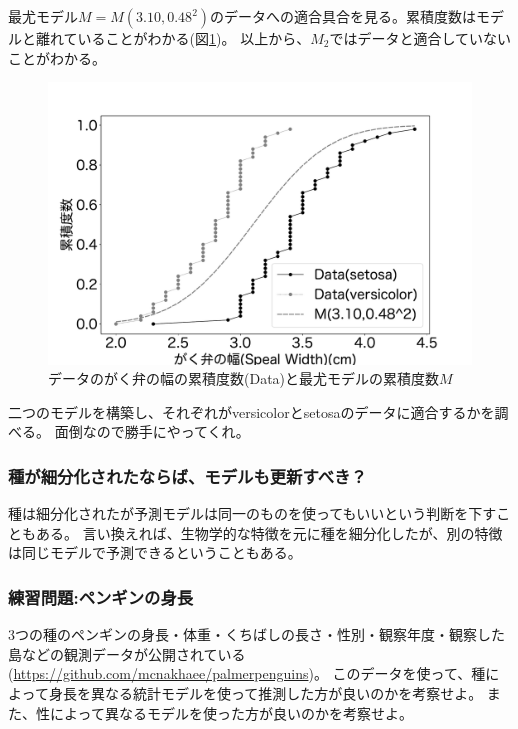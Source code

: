 最尤モデル$M=M(3.10,0.48^2)$のデータへの適合具合を見る。累積度数はモデルと離れていることがわかる(図\ref{fig:speal_width_setosa_versi_model})。
以上から、$M_2$ではデータと適合していないことがわかる。


\begin{figure}
    \begin{center}
        \includegraphics[width=15cm]{./image/15_/speal_width_seto_versi_model.pdf}
        \caption{データのがく弁の幅の累積度数(Data)と最尤モデルの累積度数$M$}
        \label{fig:speal_width_setosa_versi_model}
    \end{center}
\end{figure}


二つのモデルを構築し、それぞれがversicolorとsetosaのデータに適合するかを調べる。
面倒なので勝手にやってくれ。


\subsubsection{種が細分化されたならば、モデルも更新すべき？}
種は細分化されたが予測モデルは同一のものを使ってもいいという判断を下すこともある。
言い換えれば、生物学的な特徴を元に種を細分化したが、別の特徴は同じモデルで予測できるということもある。

\subsubsection{練習問題:ペンギンの身長}
3つの種のペンギンの身長・体重・くちばしの長さ・性別・観察年度・観察した島などの観測データが公開されている(\url{https://github.com/mcnakhaee/palmerpenguins})。
このデータを使って、種によって身長を異なる統計モデルを使って推測した方が良いのかを考察せよ。
また、性によって異なるモデルを使った方が良いのかを考察せよ。

